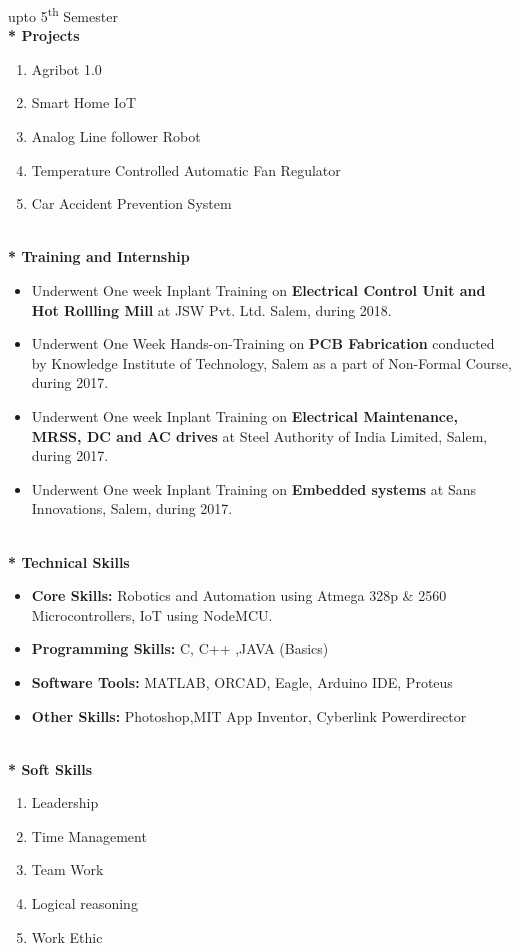 \documentclass{article}
\begin{document}
\hspace{422pt} \footnotesize *upto 5\textsuperscript{th} Semester
\large
\textbf{\\* Projects}
\begin{enumerate}
\item Agribot 1.0
\item Smart Home IoT
\item Analog Line follower Robot
\item Temperature Controlled Automatic Fan Regulator
\item Car Accident Prevention System
\end{enumerate}
\begin{flushleft}
\textbf{\\* Training and Internship}
\begin{itemize}
\item Underwent One week Inplant Training on \textbf{Electrical Control Unit and Hot Rollling Mill} at JSW Pvt. Ltd. Salem, during 2018.
\item  Underwent One Week Hands-on-Training on \textbf{PCB Fabrication} conducted by Knowledge Institute of Technology, Salem as a part of Non-Formal Course, during 2017.
\item Underwent One week Inplant Training on \textbf{Electrical Maintenance, MRSS, DC and AC drives} at Steel Authority of India Limited, Salem, during 2017.
\item Underwent One week Inplant Training on\textbf{ Embedded systems} at Sans Innovations, Salem, during 2017.
\end{itemize}


\textbf{\\* Technical Skills}
\begin{itemize}
\item \textbf{Core Skills:} Robotics and Automation using Atmega 328p \& 2560 Microcontrollers, IoT using NodeMCU.
\item \textbf{Programming Skills:} C, C++ ,JAVA (Basics) 
\item \textbf{Software Tools:} MATLAB, ORCAD, Eagle, Arduino IDE, Proteus
\item \textbf{Other Skills:} Photoshop,MIT App Inventor, Cyberlink Powerdirector
\end{itemize}

\textbf{\\* Soft Skills}
\begin{enumerate}
\item Leadership
\item Time Management
\item Team Work
\item Logical reasoning
\item Work Ethic
\end{enumerate}

\end{flushleft}
\end{document}

